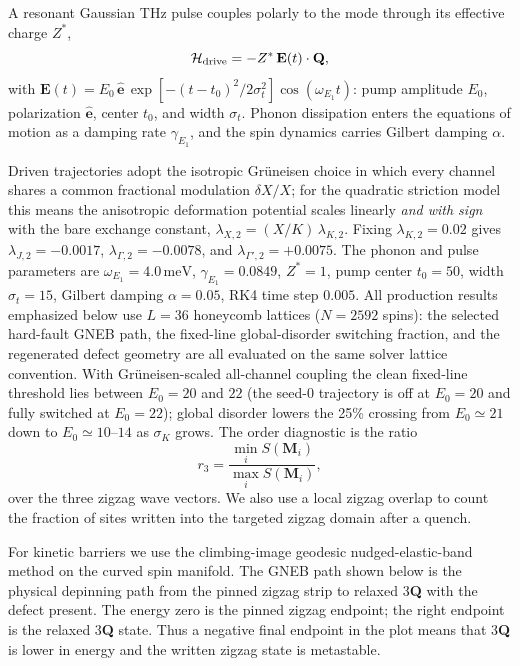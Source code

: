\documentclass[aps,prb,twocolumn,superscriptaddress,floatfix,nofootinbib]{revtex4-2}
\newcommand{\threeQ}{3\textbf{Q}}
\newcommand{\meV}{\,\mathrm{meV}}
\begin{document}
A resonant Gaussian THz pulse couples polarly to the mode through its effective
charge $Z^\ast$,
\begin{equation}
\mathcal{H}_{\rm drive} = -Z^\ast\,\mathbf{E}(t)\cdot\mathbf{Q},
\label{eq:Hdrive}
\end{equation}
with $\mathbf{E}(t)=E_0\,\hat{\mathbf{e}}\,
\exp[-(t-t_0)^2/2\sigma_t^2]\cos(\omega_{E_1}t)$: pump amplitude $E_0$,
polarization $\hat{\mathbf{e}}$, center $t_0$, and width $\sigma_t$.  Phonon
dissipation enters the equations of motion as a damping rate $\gamma_{E_1}$, and
the spin dynamics carries Gilbert damping $\alpha$.

Driven trajectories adopt the isotropic Gr\"uneisen choice in which every
channel shares a common fractional modulation $\delta X/X$; for the quadratic
striction model this means the anisotropic deformation potential scales linearly
\emph{and with sign} with the bare exchange constant,
$\lambda_{X,2}=(X/K)\,\lambda_{K,2}$.  Fixing $\lambda_{K,2}=0.02$ gives
$\lambda_{J,2}=-0.0017$, $\lambda_{\Gamma,2}=-0.0078$, and
$\lambda_{\Gamma',2}=+0.0075$.  The phonon and pulse parameters are
$\omega_{E_1}=4.0\meV$, $\gamma_{E_1}=0.0849$, $Z^\ast=1$, pump center $t_0=50$,
width $\sigma_t=15$, Gilbert damping $\alpha=0.05$, RK4 time step $0.005$.  All production results emphasized below use $L=36$ honeycomb lattices
($N=2592$ spins): the selected hard-fault GNEB path, the fixed-line
global-disorder switching fraction, and the regenerated defect geometry are all
evaluated on the same solver lattice convention.  With Gr\"uneisen-scaled all-channel coupling the clean fixed-line threshold lies
between $E_0=20$ and $22$ (the seed-0 trajectory is off at $E_0=20$ and fully
switched at $E_0=22$); global disorder lowers the 25\% crossing from
$E_0\simeq21$ down to $E_0\simeq10$--$14$ as $\sigma_K$ grows.  The order
diagnostic is
the ratio
\begin{equation}
r_3=\frac{\min_i S(\bm M_i)}{\max_i S(\bm M_i)},
\end{equation}
over the three zigzag wave vectors.  We also use a local zigzag overlap to count
the fraction of sites written into the targeted zigzag domain after a quench.

For kinetic barriers we use the climbing-image geodesic nudged-elastic-band
method on the curved spin manifold.  The GNEB path shown below is the physical
depinning path from the pinned zigzag strip to relaxed \threeQ{} with the defect
present.  The energy zero is the pinned zigzag endpoint; the right endpoint is
the relaxed \threeQ{} state.  Thus a negative final endpoint in the plot means
that \threeQ{} is lower in energy and the written zigzag state is metastable.
\end{document}
